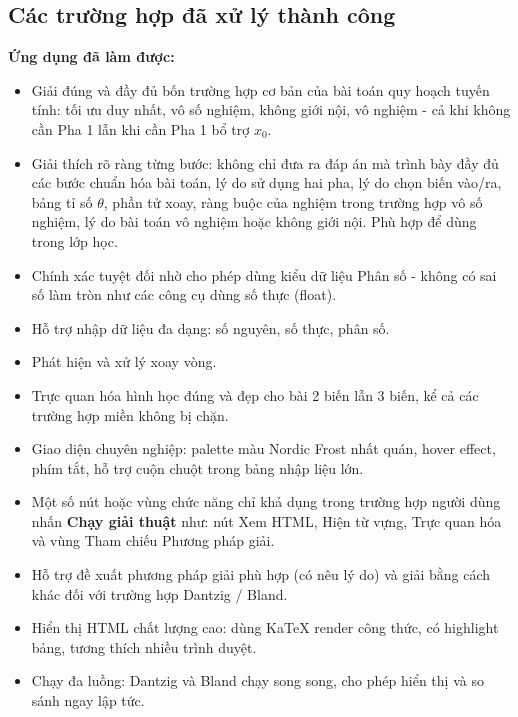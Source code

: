 \documentclass[12pt,a4paper]{article}
\begin{document}
\subsection{Các trường hợp đã xử lý thành công}
\textbf{Ứng dụng đã làm được:}
\begin{itemize}[label=\textcolor{secondary}{$\bullet$}, itemsep=1pt]
    \item Giải đúng và đầy đủ bốn trường hợp cơ bản của bài toán quy hoạch tuyến tính: tối ưu duy nhất, vô số nghiệm, không giới nội, vô nghiệm - cả khi không cần Pha 1 lẫn khi cần Pha 1 bổ trợ $x_0$.
    \item Giải thích rõ ràng từng bước: không chỉ đưa ra đáp án mà trình bày đầy đủ các bước chuẩn hóa bài toán, lý do sử dụng hai pha, lý do chọn biến vào/ra, bảng tỉ số $\theta$, phần tử xoay, ràng buộc của nghiệm trong trường hợp vô số nghiệm, lý do bài toán vô nghiệm hoặc không giới nội. Phù hợp để dùng trong lớp học.
    \item Chính xác tuyệt đối nhờ cho phép dùng kiểu dữ liệu Phân số - không có sai số làm tròn như các công cụ dùng số thực (float).
    \item Hỗ trợ nhập dữ liệu đa dạng: số nguyên, số thực, phân số.
    \item Phát hiện và xử lý xoay vòng.
    \item Trực quan hóa hình học đúng và đẹp cho bài 2 biến lẫn 3 biến, kể cả các trường hợp miền không bị chặn.
    \item Giao diện chuyên nghiệp: palette màu Nordic Frost nhất quán, hover effect, phím tắt, hỗ trợ cuộn chuột trong bảng nhập liệu lớn.
    \item Một số nút hoặc vùng chức năng chỉ khả dụng trong trường hợp người dùng nhấn \textbf{Chạy giải thuật} như: nút Xem HTML, Hiện từ vựng, Trực quan hóa và vùng Tham chiếu Phương pháp giải.
    \item Hỗ trợ đề xuất phương pháp giải phù hợp (có nêu lý do) và giải bằng cách khác đối với trường hợp Dantzig / Bland.
    \item Hiển thị HTML chất lượng cao: dùng KaTeX render công thức, có highlight bảng, tương thích nhiều trình duyệt.
    \item Chạy đa luồng: Dantzig và Bland chạy song song, cho phép hiển thị và so sánh ngay lập tức.
\end{itemize}
\end{document}
